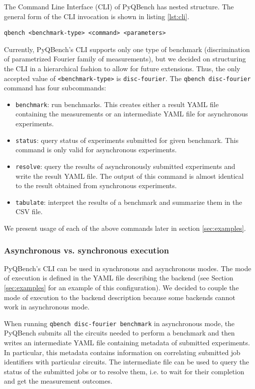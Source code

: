 \documentclass[preprint,12pt, a4paper, dvipsnames]{elsarticle}
\newcommand{\1}{{\rm 1\hspace{-0.9mm}l}}
\theoremstyle{definition}
\begin{document}
The Command Line Interface (CLI) of PyQBench has nested structure. The general form of the CLI
invocation is shown in listing \ref{lst:cli}.
\begin{lstlisting}[caption=Invocation of \texttt{qbench} script, label=lst:cli]
qbench <benchmark-type> <command> <parameters>
\end{lstlisting}
Currently, PyQBench's CLI supports only one type of benchmark (discrimination of parametrized
Fourier family of measurements), but we decided on structuring the CLI in a hierarchical
fashion to allow for future extensions. Thus, the only accepted value of \texttt{<benchmark-type>}
is \texttt{disc-fourier}.
%
The \texttt{qbench disc-fourier} command has four subcommands:

\begin{itemize}
	\item \texttt{benchmark}: run benchmarks. This creates either a result YAML file containing
	the measurements or an intermediate YAML file for asynchronous experiments.
	\item \texttt{status}: query status of experiments submitted for given benchmark. This command
	is only valid for asynchronous experiments.
	\item \texttt{resolve}: query the results of asynchronously submitted experiments and write the
	result YAML file. The output of this command is almost identical to the result obtained from
	synchronous experiments.
	\item \texttt{tabulate}: interpret the results of a benchmark and summarize them in the CSV file.
\end{itemize}
%
We present usage of each of the above commands later in section \ref{sec:examples}.

\subsubsection{Asynchronous vs. synchronous execution}
PyQBench's CLI can be used in synchronous and asynchronous modes. The
mode of execution is defined in the YAML file describing the backend (see Section
\ref{sec:examples} for an example of this configuration). We decided to couple the mode of execution to
the backend description because some backends cannot work in asynchronous mode.

When running \texttt{qbench disc-fourier benchmark} in asynchronous mode, the PyQBench submits all
the circuits needed to perform a benchmark and then writes an intermediate YAML file
containing metadata of submitted experiments. In particular, this metadata contains information on
correlating submitted job identifiers with particular circuits. The intermediate file can be
used to query the status of the submitted jobs or to resolve them, i.e. to wait for their completion
and get the measurement outcomes.
\end{document}
